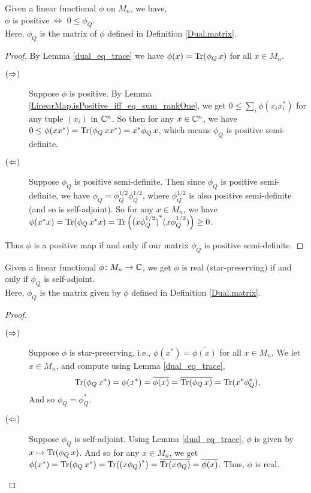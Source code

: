  \begin{lemma}\label{Dual.isPosMap_iff_of_matrix}\leanok
   Given a linear functional $\phi$ on $M_n$, we have,\\
   \hspace*{0.5cm}$\phi$ is positive $\,\Leftrightarrow\,$ $0\leq\phi_Q$.\\
   Here, $\phi_Q$ is the matrix of $\phi$ defined in Definition \ref{Dual.matrix}.
  \end{lemma}
  \begin{proof}\leanok
   By Lemma \ref{dual_eq_trace} we have $\phi(x)=\operatorname{Tr}(\phi_Q\, x)$ for all $x\in{M_n}$.
   \begin{description}
    \item[$(\Rightarrow)$]
     Suppose $\phi$ is positive. By Lemma \ref{LinearMap.isPositive_iff_eq_sum_rankOne}, we get $0\leq\sum_i\phi(x_ix_i^*)$ for any tuple $(x_i)$ in $\mathbb{C}^n$. So then for any $x\in\mathbb{C}^n$, we have $0\leq\phi(xx^*)=\operatorname{Tr}(\phi_Q\, xx^*)=x^*\phi_Q\, x$, which means $\phi_Q$ is positive semi-definite.
    \item[$(\Leftarrow)$]
     Suppose $\phi_Q$ is positive semi-definite. Then since $\phi_Q$ is positive semi-definite, we have $\phi_Q=\phi_Q^{1/2}\phi_Q^{1/2}$, where $\phi_Q^{1/2}$ is also positive semi-definite (and so is self-adjoint). So for any $x\in{M_n}$, we have $\phi(x^*x)=\operatorname{Tr}(\phi_Q\, x^*x)=\operatorname{Tr}\left({(x\phi_Q^{1/2})}^*(x\phi_Q^{1/2})\right)\geq0$.
   \end{description}
   Thus $\phi$ is a positive map if and only if our matrix $\phi_Q$ is positive semi-definite.
  \end{proof}

  \begin{proposition}\label{Dual.isReal_iff}\leanok
   Given a linear functional $\phi\colon{M_n}\to\mathbb{C}$, we get $\phi$ is real (star-preserving) if and only if $\phi_Q$ is self-adjoint.\\
   Here, $\phi_Q$ is the matrix given by $\phi$ defined in Definition \ref{Dual.matrix}.
  \end{proposition}
  \begin{proof}\leanok {\ }
   \begin{description}
    \item[$(\Rightarrow)$]
     Suppose $\phi$ is star-preserving, i.e., $\phi(x^*)=\overline{\phi(x)}$ for all $x\in{M_n}$.
     We let $x\in{M_n}$, and compute using Lemma \ref{dual_eq_trace},
     \[\operatorname{Tr}(\phi_Q\, x^*)=\phi(x^*)=\overline{\phi(x)}=\overline{\operatorname{Tr}(\phi_Q\, x)}=\operatorname{Tr}(x^*\phi_Q^*),\]
     And so $\phi_Q=\phi_Q^*$.
    \item[$(\Leftarrow)$]
     Suppose $\phi_Q$ is self-adjoint. Using Lemma \ref{dual_eq_trace}, $\phi$ is given by $x\mapsto\operatorname{Tr}(\phi_Q\, x)$.
     And so for any $x\in{M_n}$, we get $\phi(x^*)=\operatorname{Tr}(\phi_Q\, x^*)=\operatorname{Tr}({(x\phi_Q)}^*)=\overline{\operatorname{Tr}(x\phi_Q)}=\overline{\phi(x)}$.
     Thus, $\phi$ is real.
   \end{description}
  \end{proof}

